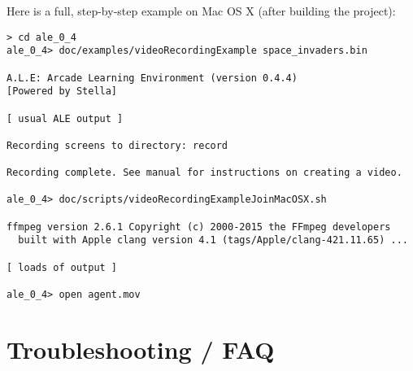 \documentclass[12pt]{article}
\begin{document}
Here is a full, step-by-step example on Mac OS X (after building the project):
\begin{verbatim}
> cd ale_0_4
ale_0_4> doc/examples/videoRecordingExample space_invaders.bin

A.L.E: Arcade Learning Environment (version 0.4.4)
[Powered by Stella]

[ usual ALE output ]

Recording screens to directory: record

Recording complete. See manual for instructions on creating a video.

ale_0_4> doc/scripts/videoRecordingExampleJoinMacOSX.sh

ffmpeg version 2.6.1 Copyright (c) 2000-2015 the FFmpeg developers
  built with Apple clang version 4.1 (tags/Apple/clang-421.11.65) ... 

[ loads of output ]

ale_0_4> open agent.mov
\end{verbatim}

\section{Troubleshooting / FAQ} \label{sec:troubleshooting}
\end{document}
